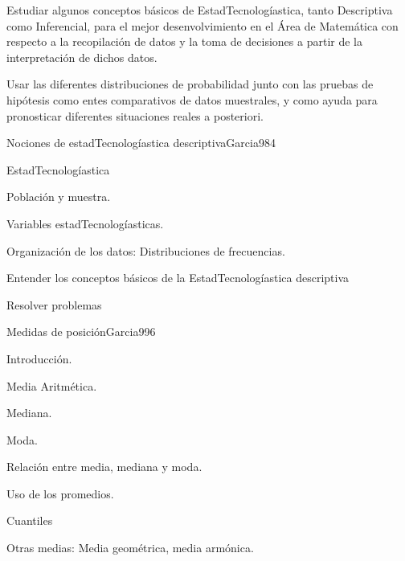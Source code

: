 \begin{syllabus}


\begin{goals}
\item  Estudiar algunos conceptos básicos de EstadTecnologíastica, tanto Descriptiva como Inferencial, para el mejor desenvolvimiento en el Área de Matemática con respecto a la recopilación de datos y la toma de decisiones a partir de la interpretación de dichos datos.
\item  Usar las diferentes distribuciones de probabilidad junto con las pruebas de hipótesis como entes comparativos de datos muestrales, y como ayuda para pronosticar diferentes situaciones reales a posteriori.
\end{goals}

\begin{outcomes}
\end{outcomes}

\begin{unit}{Nociones de estadTecnologíastica descriptiva}{Garcia98}{4}
   \begin{topics}
         \item  EstadTecnologíastica
	 \item  Población y muestra.
	 \item  Variables estadTecnologíasticas.
         \item  Organización de los datos: Distribuciones de frecuencias.
   \end{topics}

   \begin{unitgoals}
         \item  Entender los conceptos básicos de la EstadTecnologíastica descriptiva
         \item  Resolver problemas
   \end{unitgoals}
\end{unit}

\begin{unit}{Medidas de posición}{Garcia99}{6}
   \begin{topics}
	\item Introducción.
	\item Media Aritmética.
	\item Mediana.
	\item Moda.
	\item Relación entre media, mediana y moda.
	\item Uso de los promedios.
	\item Cuantiles
	\item Otras medias: Media geométrica, media armónica.
   \end{topics}


\end{unit}
\end{syllabus}
